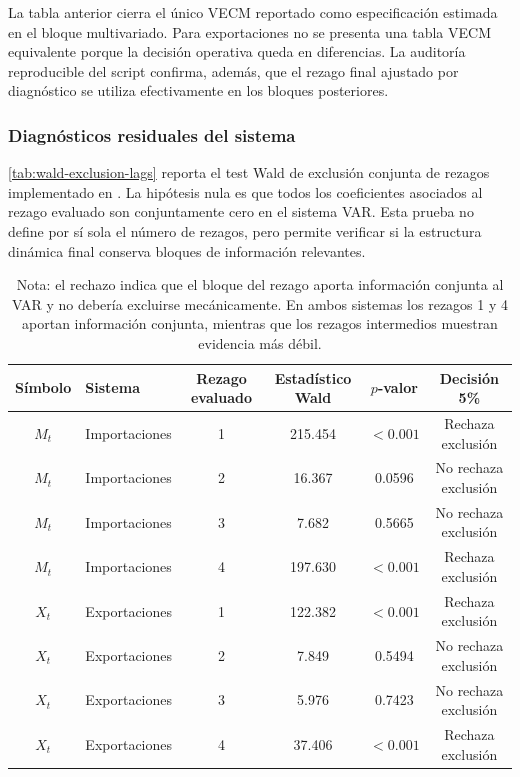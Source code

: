 \documentclass[11pt,a4paper]{article}
\begin{document}
	La tabla anterior cierra el único VECM reportado como especificación estimada
	en el bloque multivariado. Para exportaciones no se presenta una tabla VECM
	equivalente porque la decisión operativa queda en diferencias. La auditoría
	reproducible del script confirma, además, que el rezago final ajustado por
	diagnóstico se utiliza efectivamente en los bloques posteriores.
	
	\subsubsection{Diagnósticos residuales del sistema}
	\label{subsubsec:diagnosticos-residuales-var}
	
	\autoref{tab:wald-exclusion-lags} reporta el test Wald de exclusión conjunta de
	rezagos implementado en . La hipótesis nula
	es que todos los coeficientes asociados al rezago evaluado son conjuntamente
	cero en el sistema VAR. Esta prueba no define por sí sola el número de rezagos,
	pero permite verificar si la estructura dinámica final conserva bloques de
	información relevantes.
	
	\begin{table}[H]
		\centering
		\caption{Test Wald de exclusión conjunta de rezagos VAR.}
		\label{tab:wald-exclusion-lags}
		\small
		\begin{tabular}{clcccc}
			\toprule
			Símbolo & Sistema & Rezago evaluado & Estadístico Wald & \(p\)-valor & Decisión 5\% \\
			\midrule
			\(M_t\) & Importaciones & 1 & 215.454 & \(<0.001\) & Rechaza exclusión \\
			\(M_t\) & Importaciones & 2 & 16.367 & 0.0596 & No rechaza exclusión \\
			\(M_t\) & Importaciones & 3 & 7.682 & 0.5665 & No rechaza exclusión \\
			\(M_t\) & Importaciones & 4 & 197.630 & \(<0.001\) & Rechaza exclusión \\
			\(X_t\) & Exportaciones & 1 & 122.382 & \(<0.001\) & Rechaza exclusión \\
			\(X_t\) & Exportaciones & 2 & 7.849 & 0.5494 & No rechaza exclusión \\
			\(X_t\) & Exportaciones & 3 & 5.976 & 0.7423 & No rechaza exclusión \\
			\(X_t\) & Exportaciones & 4 & 37.406 & \(<0.001\) & Rechaza exclusión \\
			\bottomrule
		\end{tabular}
		\caption*{\footnotesize Nota: el rechazo indica que el bloque del rezago aporta
			información conjunta al VAR y no debería excluirse mecánicamente. En ambos
			sistemas los rezagos 1 y 4 aportan información conjunta, mientras que los
			rezagos intermedios muestran evidencia más débil.}
	\end{table}
	
\end{document}
